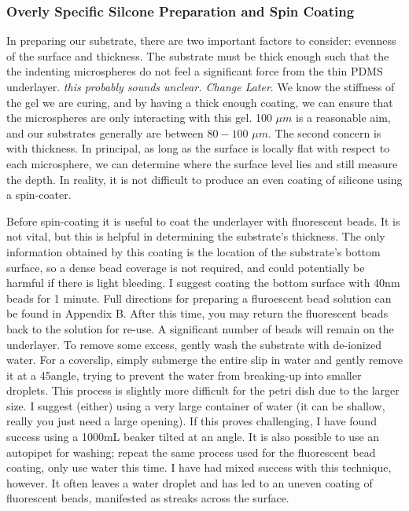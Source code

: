 \subsubsection{Overly Specific Silcone Preparation and Spin Coating}
In preparing our substrate, there are two important factors to consider: evenness of the surface and thickness. The substrate must be thick enough such that the the indenting microspheres do not feel a significant force from the thin PDMS underlayer. \emph{this probably sounds unclear. Change Later}. We know the stiffness of the gel we are curing, and by having a thick enough coating, we can ensure that the microspheres are only interacting with this gel. 100 $\mu m$ is a reasonable aim, and our substrates generally are between $80-100$ $\mu m$. The second concern is with thickness. In principal, as long as the surface is locally flat with respect to each microsphere, we can determine where the surface level lies and still measure the depth. In reality, it is not difficult to produce an even coating of silicone using a spin-coater. 

Before spin-coating it is useful to coat the underlayer with fluorescent beads. It is not vital, but this is helpful in determining the substrate's thickness. The only information obtained by this coating is the location of the substrate's bottom surface, so a dense bead coverage is not required, and could potentially be harmful if there is light bleeding. I suggest coating the bottom surface with 40nm beads for 1 minute. Full directions for preparing a fluroescent bead solution can be found in Appendix B. After this time, you may return the fluorescent beads back to the solution for re-use. A significant number of beads will remain on the underlayer. To remove some excess, gently wash the substrate with de-ionized water. For a coverslip, simply submerge the entire slip in water and gently remove it at a 45\degree angle, trying to prevent the water from breaking-up into smaller droplets. This process is slightly more difficult for the petri dish due to the larger size. I suggest  (either) using a very large container of water (it can be shallow, really you just need a large opening). If this proves challenging, I have found success using a 1000mL beaker tilted at an angle. It is also possible to use an autopipet for washing; repeat the same process used for the fluorescent bead coating, only use water this time. I have had mixed success with this technique, however. It often leaves a water droplet and has led to an uneven coating of fluorescent beads, manifested as streaks across the surface.

